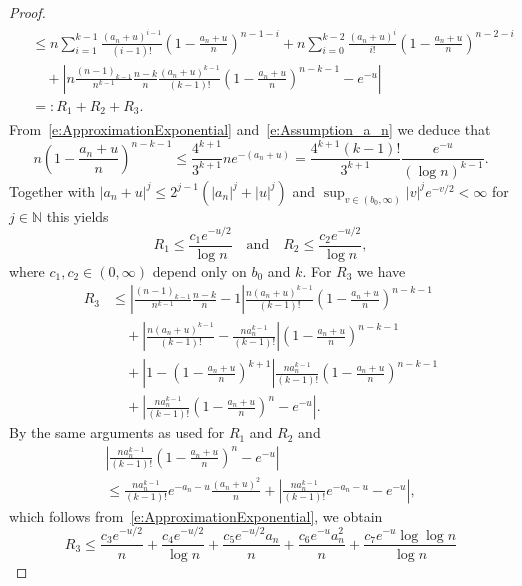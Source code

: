 \documentclass[10pt]{amsart}
\theoremstyle{definition}\newtheorem{defi}[theo]{Definition}\newtheorem{rema}[theo]{Remark}\newtheorem{exam}[theo]{Example}\newtheorem{exem}[theo]{Example}\newtheorem{nota}[theo]{Notation}
\newcommand*\N{\mathbb{N}}
\begin{document}
\begin{proof}
\begin{multline*}
\begin{aligned}
& \leq n \sum_{i=1}^{k-1} \frac{\left(a_n+u\right)^{i-1}}{(i-1)!} \left(1 - \frac{a_n+u}{n} \right)^{n-1-i} + n \sum_{i=0}^{k-2} \frac{(a_n+u)^i}{i!} \left(1 - \frac{a_n+u}{n} \right)^{n-2-i} \\
& \quad + \left|n \frac{(n-1)_{k-1}}{n^{k-1}} \frac{n-k}{n} \frac{(a_n+u)^{k-1}}{(k-1)!} \left(1 - \frac{a_n+u}{n} \right)^{n-k-1} - e^{-u} \right| \\
& =: R_1+R_2+R_3.
\end{aligned}
\end{multline*}
From~\eqref{e:ApproximationExponential} and~\eqref{e:Assumption_a_n} we deduce that
\[
n\left(1 - \frac{a_n+u}{n} \right)^{n-k-1} \leq \frac{4^{k+1}}{3^{k+1}} n e^{-(a_n+u)}= \frac{4^{k+1} (k-1)!}{3^{k+1}} \frac{e^{-u}}{(\log n)^{k-1}}.
\]
Together with $|a_n+u|^j\leq 2^{j-1} (|a_n|^j + |u|^j)$ and $\sup_{v\in (b_0,\infty)} |v|^j e^{-v/2}<\infty$ for $j\in\N$ this yields
\[
R_1 \leq \frac{c_1 e^{-u/2}}{\log n} \quad \text{and} \quad R_2 \leq \frac{c_2 e^{-u/2}}{\log n},
\]
where $c_1,c_2\in(0,\infty)$ depend only on $b_0$ and $k$. For $R_3$ we have
\begin{align*}
R_3 & \leq \left| \frac{(n-1)_{k-1}}{n^{k-1}} \frac{n-k}{n} - 1 \right| \frac{n (a_n+u)^{k-1}}{(k-1)!} \left(1 - \frac{a_n+u}{n} \right)^{n-k-1} \\
& \quad + \left| \frac{n (a_n+u)^{k-1}}{(k-1)!} - \frac{n a_n^{k-1}}{(k-1)!} \right| \left(1 - \frac{a_n+u}{n} \right)^{n-k-1} \\
& \quad + \left| 1 - \left(1 - \frac{a_n+u}{n} \right)^{k+1} \right| \frac{n a_n^{k-1}}{(k-1)!} \left(1 - \frac{a_n+u}{n} \right)^{n-k-1}\\
&\quad + \left| \frac{n a_n^{k-1}}{(k-1)!} \left(1 - \frac{a_n+u}{n} \right)^{n} - e^{-u} \right|.
\end{align*}
By the same arguments as used for $R_1$ and $R_2$ and
\begin{multline*}
\left| \frac{n a_n^{k-1}}{(k-1)!} \left(1 - \frac{a_n+u}{n} \right)^{n} - e^{-u} \right|\\
\leq \frac{n a_n^{k-1}}{(k-1)!} e^{-a_n-u} \frac{\left(a_n+u\right)^2}{n} + \left| \frac{n a_n^{k-1}}{(k-1)!} e^{-a_n-u} - e^{-u} \right|,
\end{multline*}
which follows from~\eqref{e:ApproximationExponential}, we obtain
\[
R_3 \leq \frac{c_3 e^{-u/2}}{n} + \frac{c_4 e^{-u/2}}{\log n} + \frac{c_5 e^{-u/2} a_n}{n} + \frac{c_6 e^{-u} a_n^2}{n} + \frac{c_7 e^{-u} \log\log n}{\log n}
\]
\vspace{10pt}
\pagebreak


\end{proof}
\end{document}
